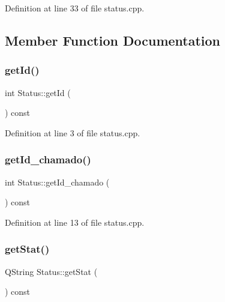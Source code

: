 Definition at line 33 of file status.\+cpp.



\subsection{Member Function Documentation}
\hypertarget{class_status_adb9c28d4221d9e2aaf9875b80b5eeaaf}{}\label{class_status_adb9c28d4221d9e2aaf9875b80b5eeaaf} 
\subsubsection{\texorpdfstring{get\+Id()}{getId()}}
{\footnotesize\ttfamily int Status\+::get\+Id (\begin{DoxyParamCaption}{ }\end{DoxyParamCaption}) const}



Definition at line 3 of file status.\+cpp.

\hypertarget{class_status_a9c4b616186e22599d7a6ce48ec724e3c}{}\label{class_status_a9c4b616186e22599d7a6ce48ec724e3c} 
\subsubsection{\texorpdfstring{get\+Id\+\_\+chamado()}{getId\_chamado()}}
{\footnotesize\ttfamily int Status\+::get\+Id\+\_\+chamado (\begin{DoxyParamCaption}{ }\end{DoxyParamCaption}) const}



Definition at line 13 of file status.\+cpp.

\hypertarget{class_status_a5be3ea6f3dd893039eb1278ba89d19bd}{}\label{class_status_a5be3ea6f3dd893039eb1278ba89d19bd} 
\subsubsection{\texorpdfstring{get\+Stat()}{getStat()}}
{\footnotesize\ttfamily Q\+String Status\+::get\+Stat (\begin{DoxyParamCaption}{ }\end{DoxyParamCaption}) const}



